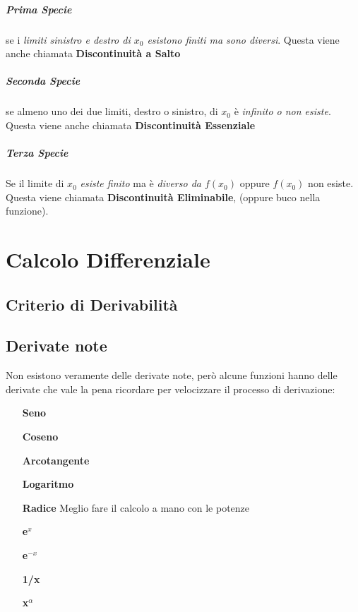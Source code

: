 \documentclass[12pt, a4paper, openany]{book}
\begin{document}
	\paragraph{Prima Specie} se i \emph{limiti sinistro e destro di $x_0$ esistono finiti ma sono diversi}.
	Questa viene anche chiamata \textbf{Discontinuità a Salto}
	\paragraph{Seconda Specie} se almeno uno dei due limiti, destro o sinistro, di $x_0$ è \emph{infinito o non esiste}.
	Questa viene anche chiamata \textbf{Discontinuità Essenziale}
	\paragraph{Terza Specie} Se il limite di $x_0$ \emph{esiste finito} ma è \emph{diverso da $f(x_0)$} oppure $f(x_0)$ non esiste.
	Questa viene chiamata \textbf{Discontinuità Eliminabile}, (oppure buco nella funzione).


	\chapter{Calcolo Differenziale}
	\section{Criterio di Derivabilità}
	\section{Derivate note}
	Non esistono veramente delle derivate note, però alcune funzioni hanno delle derivate che vale la pena ricordare per velocizzare il processo di derivazione:

	\begin{itemize}
		\item[\textbf{Seno}] 
		\item[\textbf{Coseno}] 
		\item[\textbf{Arcotangente}] 
		\item[\textbf{Logaritmo}] 
		\item[\textbf{Radice}] Meglio fare il calcolo a mano con le potenze%
		\item[\textbf{e$^x$}] 
		\item[\textbf{e$^{-x}$}] 
		\item[\textbf{1/x}] 
		\item[\textbf{x$^\alpha$}] 
	\end{itemize}
\end{document}
